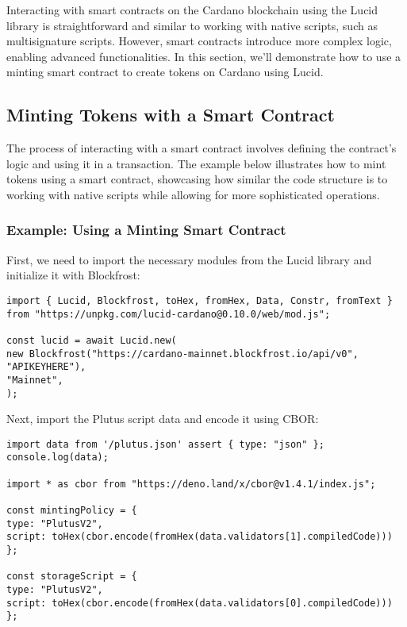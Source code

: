 Interacting with smart contracts on the Cardano blockchain using the Lucid library is straightforward and similar to working with native scripts, such as multisignature scripts. However, smart contracts introduce more complex logic, enabling advanced functionalities. In this section, we'll demonstrate how to use a minting smart contract to create tokens on Cardano using Lucid.

\subsection{Minting Tokens with a Smart Contract}

The process of interacting with a smart contract involves defining the contract's logic and using it in a transaction. The example below illustrates how to mint tokens using a smart contract, showcasing how similar the code structure is to working with native scripts while allowing for more sophisticated operations.

\subsubsection{Example: Using a Minting Smart Contract}

First, we need to import the necessary modules from the Lucid library and initialize it with Blockfrost:

\begin{lstlisting}
import { Lucid, Blockfrost, toHex, fromHex, Data, Constr, fromText } from "https://unpkg.com/lucid-cardano@0.10.0/web/mod.js";

const lucid = await Lucid.new(
new Blockfrost("https://cardano-mainnet.blockfrost.io/api/v0", "APIKEYHERE"),
"Mainnet",
);
\end{lstlisting}

Next, import the Plutus script data and encode it using CBOR:

\begin{lstlisting}
import data from '/plutus.json' assert { type: "json" };
console.log(data);

import * as cbor from "https://deno.land/x/cbor@v1.4.1/index.js";

const mintingPolicy = {
type: "PlutusV2",
script: toHex(cbor.encode(fromHex(data.validators[1].compiledCode)))
};

const storageScript = {
type: "PlutusV2",
script: toHex(cbor.encode(fromHex(data.validators[0].compiledCode)))
};
\end{lstlisting}

